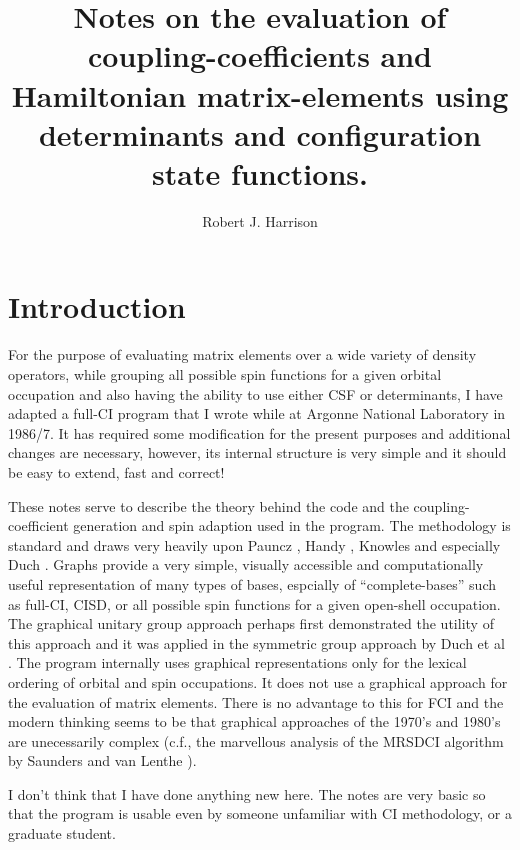 \documentclass[fullpage,12pt,fleqn]{article}
\title{Notes on the evaluation of coupling-coefficients and Hamiltonian matrix-elements using determinants and configuration state functions.}
\author{Robert J. Harrison}
\date{}
\begin{document}
\maketitle

\clearpage

\tableofcontents

\clearpage

\section{Introduction}

For the purpose of evaluating matrix elements over a wide variety of
density operators, while grouping all possible spin functions for a
given orbital occupation and also having the ability to use either CSF
or determinants, I have adapted a full-CI program that I wrote while at
Argonne National Laboratory in 1986/7.  It has required some
modification for the present purposes and additional changes are
necessary, however, its internal structure is very simple and it
should be easy to extend, fast and correct!

These notes serve to describe the theory behind the code and the
coupling-coefficient generation and spin adaption used in the program.
The methodology is standard and draws very heavily upon Pauncz
\cite{pauncz,paunczsym}, Handy \cite{handyfci}, Knowles
\cite{knowleseai} and especially Duch
\cite{duchug,duchspinad,duchcouple,duchfci,duchsga}.  Graphs provide a
very simple, visually accessible and computationally useful
representation of many types of bases, espcially of ``complete-bases''
such as full-CI, CISD, or all possible spin functions for a given
open-shell occupation.  The graphical unitary group approach
\cite{paldusguga,shavittguga,shavittguga2} perhaps first demonstrated
the utility of this approach and it was applied in the symmetric group
approach by Duch et al \cite{duchsga}.  The program internally uses
graphical representations only for the lexical ordering of orbital and
spin occupations.  It does not use a graphical approach for the
evaluation of matrix elements.  There is no advantage to this for FCI
and the modern thinking seems to be that graphical approaches of the
1970's and 1980's are unecessarily complex (c.f., the marvellous
analysis of the MRSDCI algorithm by Saunders and van Lenthe
\cite{saunders}).

I don't think that I have done anything new here.  The notes are very
basic so that the program is usable even by someone unfamiliar with CI
methodology, or a graduate student.
\end{document}
